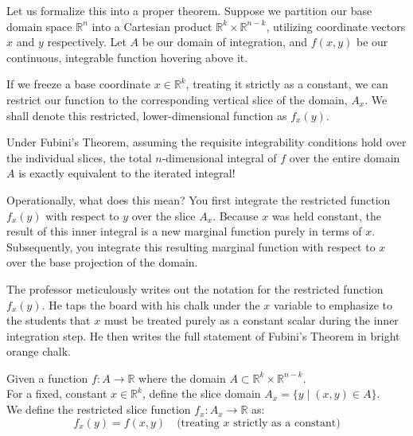 \begin{spoken-clean}[34:15 - 38:00]
Let us formalize this into a proper theorem. Suppose we partition our base domain space $\mathbb{R}^n$ into a Cartesian product $\mathbb{R}^k \times \mathbb{R}^{n-k}$, utilizing coordinate vectors $x$ and $y$ respectively. Let $A$ be our domain of integration, and $f(x,y)$ be our continuous, integrable function hovering above it.

If we freeze a base coordinate $x \in \mathbb{R}^k$, treating it strictly as a constant, we can restrict our function to the corresponding vertical slice of the domain, $A_x$. We shall denote this restricted, lower-dimensional function as $f_x(y)$. 

Under Fubini's Theorem, assuming the requisite integrability conditions hold over the individual slices, the total $n$-dimensional integral of $f$ over the entire domain $A$ is exactly equivalent to the iterated integral! 

Operationally, what does this mean? You first integrate the restricted function $f_x(y)$ with respect to $y$ over the slice $A_x$. Because $x$ was held constant, the result of this inner integral is a new marginal function purely in terms of $x$. Subsequently, you integrate this resulting marginal function with respect to $x$ over the base projection of the domain.
\end{spoken-clean}

\begin{ai-note}
The professor meticulously writes out the notation for the restricted function $f_x(y)$. He taps the board with his chalk under the $x$ variable to emphasize to the students that $x$ must be treated purely as a constant scalar during the inner integration step. He then writes the full statement of Fubini's Theorem in bright orange chalk.
\end{ai-note}

\begin{math-stroke}
Given a function $f: A \to \mathbb{R}$ where the domain $A \subset \mathbb{R}^k \times \mathbb{R}^{n-k}$. \\
For a fixed, constant $x \in \mathbb{R}^k$, define the slice domain $A_x = \{y \mid (x,y) \in A\}$. \\
We define the restricted slice function $f_x: A_x \to \mathbb{R}$ as:
\[
f_x(y) = f(x,y) \quad \text{(treating } x \text{ strictly as a constant)}
\]
\end{math-stroke}


